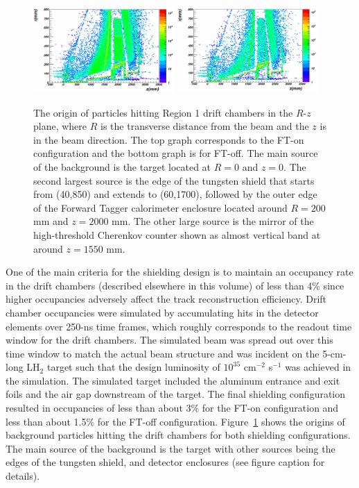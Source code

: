 \begin{figure}[t]
\begin{center}
\includegraphics[width=0.48\textwidth]{fton_final_origin.pdf}
\includegraphics[width=0.48\textwidth]{ftoff_final_origin.pdf}
	\caption{The origin of particles hitting Region 1 drift chambers in the $R$-$z$ plane, where $R$ is the transverse distance from 
	the beam and the $z$ is in the beam direction. The top graph corresponds to the FT-on configuration and the bottom graph is for 
	FT-off. The main source of the background is the target located at $R=0$ and $z=0$. The second largest source is the edge of 
	the tungsten shield that starts from (40,850) and extends to (60,1700), followed by the outer edge of the Forward Tagger calorimeter 
	enclosure located around $R=200$ mm and $z=2000$ mm. The other large source is the mirror of the high-threshold Cherenkov 
	counter shown as almost vertical band at around $z=1550$ mm.}
\label{fig:origin}
\end{center}
\end{figure}

One of the main criteria for the shielding design is to maintain an occupancy rate in the drift chambers (described elsewhere in this volume)
of less than 4\% since higher occupancies adversely affect the track reconstruction efficiency.  Drift chamber occupancies were simulated 
by accumulating hits in the detector elements over 250-ns time frames, which roughly corresponds to the readout time window for the drift 
chambers. The simulated beam was spread out over this time window to match the actual beam structure and was incident on the 5-cm-long 
LH$_2$ target such that the design luminosity of $10^{35}$ cm$^{-2}$ s$^{-1}$ was achieved in the simulation. The simulated target 
included the aluminum entrance and exit foils and the air gap downstream of the target. The final shielding configuration resulted in 
occupancies of less than about 3\% for the FT-on configuration and less than about 1.5\% for the FT-off configuration.  Figure~\ref{fig:origin} 
shows the origins of background particles hitting the drift chambers for both shielding configurations. The main source of the background 
is the target with other sources being the edges of the tungsten shield, and detector enclosures (see figure caption for details). 



